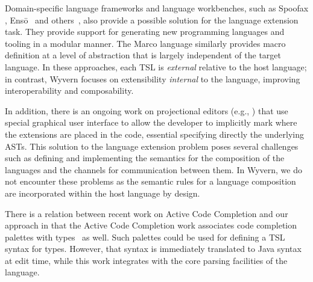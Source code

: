 Domain-specific language frameworks and language workbenches, such as Spoofax \cite{KatsVisser2010}, Ens\={o}~\cite{enso} and others~\cite{krahn2008monticore,van1992pregmatic}, also provide a possible solution for the language extension task. They provide support for generating new programming languages and tooling in a modular manner.  The Marco language \cite{lee:2012:marco} similarly provides macro definition at a level of abstraction that is largely independent of the target language. In these approaches, each TSL is \emph{external} relative to the host language; in contrast, Wyvern focuses on extensibility \emph{internal} to the language, improving interoperability and composability.

In addition, there is an ongoing work on projectional editors (e.g., \cite{mps,Diekmann:2013}) that use special graphical user interface to allow the developer to implicitly mark where the extensions are placed in the code, essential specifying directly the underlying ASTs. This solution to the language extension problem poses several challenges such as defining and implementing the semantics for the composition of the languages and the channels for communication between them. In Wyvern, we do not encounter these problems as the semantic rules for a language composition are incorporated within the host language by design.

There is a relation between recent work on Active Code Completion and our approach in that
the Active Code Completion work associates code completion palettes with types~\cite{omar2012active} as well. Such palettes could be used for defining a TSL syntax for types. However, that syntax
is immediately translated to Java syntax at edit time, while this work
integrates with the core parsing facilities of the language.
